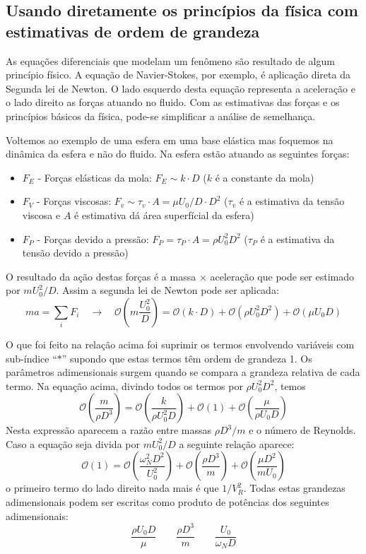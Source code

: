 \documentclass[article,12pt,oneside,a4paper,english,brazil,sumario=tradicional]{abntex2}
\newcommand{\lra}{\ensuremath{\longrightarrow}}
\newcommand{\qrq}{\ensuremath{\quad\lra\quad}}
\newcommand{\bigO}[1]{\ensuremath{\mathcal{O}\left(#1\right)}}
\begin{document}
\subsection{Usando diretamente os princípios da física com estimativas de ordem de grandeza}
As equações diferenciais que modelam um fenômeno são resultado de algum princípio físico. A equação de Navier-Stokes, por exemplo, é aplicação direta da Segunda lei de Newton. O lado esquerdo desta equação representa a aceleração e o lado direito as forças atuando no fluido. Com as estimativas das forças e os princípios básicos da física, pode-se simplificar a análise de semelhança. 

Voltemos ao exemplo de uma esfera em uma base elástica mas foquemos na dinâmica da esfera e não do fluido. Na esfera estão atuando as seguintes forças:
\begin{itemize}
\item $F_E$ - Forças elásticas da mola: $F_E \sim k\cdot D$ ($k$ é a constante da mola)
\item $F_V$ - Forças viscosas: $F_v \sim \tau_v \cdot A = \mu U_0/D \cdot D^2$ ($\tau_v$ é a estimativa da tensão viscosa e $A$ é estimativa dá área superfícial da esfera)
\item $F_P$ - Forças devido a pressão: $F_P = \tau_P \cdot A = \rho U_0^2 D^2$ ($\tau_P$ é a estimativa da tensão devido a pressão)
\end{itemize}
O resultado da ação destas forças é a massa $\times$ aceleração que pode ser estimado por $mU_0^2/D$. Assim a segunda lei de Newton pode ser aplicada:
\[
ma = \sum_i F_i \qrq \bigO{m\frac{U_0^2}{D}} = \bigO{k\cdot D} + \bigO{\rho U_0^2 D^2} + \bigO{\mu U_0 D}
\]

O que foi feito na relação acima foi suprimir os termos envolvendo variáveis com sub-índice ``$*$'' supondo que estas termos têm ordem de grandeza 1. Os parâmetros adimensionais surgem quando se compara a grandeza relativa de cada termo. Na equação acima, divindo todos os termos por $\rho U_0^2 D^2$, temos
\[
\bigO{\frac{m}{\rho D^3}} = \bigO{\frac{k}{\rho U_0^2 D}} + \bigO{1} + \bigO{\frac{\mu}{\rho U_0 D}}
\]
Nesta expressão aparecem a razão entre massas $\rho D^3/m$ e o número de Reynolds. Caso a equação seja divida por $m U_0^2/D$ a seguinte relação aparece:
\[
\bigO{1} = \bigO{\frac{\omega_N^2 D^2}{U_0^2}} + \bigO{\frac{\rho D^3}{m}} + \bigO{\frac{\mu D^2}{m U_0}}
\]
o primeiro termo do lado direito nada mais é que $1/V_R^2$. Todas estas grandezas adimensionais podem ser escritas como produto de potências dos seguintes adimensionais:
\[
\frac{\rho U_0 D}{\mu} \qquad \frac{\rho D^3}{m} \qquad \frac{U_0}{\omega_N D}
\]
\end{document}
